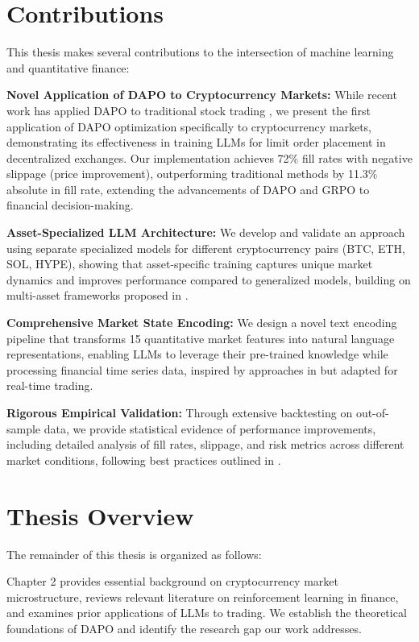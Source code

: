 \documentclass{report}
\begin{document}
\section{Contributions}

This thesis makes several contributions to the intersection of machine learning and quantitative finance:

\textbf{Novel Application of DAPO to Cryptocurrency Markets:} While recent work has applied DAPO to traditional stock trading \cite{Zha2025}, we present the first application of DAPO optimization specifically to cryptocurrency markets, demonstrating its effectiveness in training LLMs for limit order placement in decentralized exchanges. Our implementation achieves 72\% fill rates with negative slippage (price improvement), outperforming traditional methods by 11.3\% absolute in fill rate, extending the advancements of DAPO \cite{DAPO2025} and GRPO \cite{GRPO2024} to financial decision-making.

\textbf{Asset-Specialized LLM Architecture:} We develop and validate an approach using separate specialized models for different cryptocurrency pairs (BTC, ETH, SOL, HYPE), showing that asset-specific training captures unique market dynamics and improves performance compared to generalized models, building on multi-asset frameworks proposed in \cite{Zhang2023}.

\textbf{Comprehensive Market State Encoding:} We design a novel text encoding pipeline that transforms 15 quantitative market features into natural language representations, enabling LLMs to leverage their pre-trained knowledge while processing financial time series data, inspired by approaches in \cite{Wu2023} but adapted for real-time trading.

\textbf{Rigorous Empirical Validation:} Through extensive backtesting on out-of-sample data, we provide statistical evidence of performance improvements, including detailed analysis of fill rates, slippage, and risk metrics across different market conditions, following best practices outlined in \cite{Fang2022}.

\section{Thesis Overview}

The remainder of this thesis is organized as follows:

Chapter 2 provides essential background on cryptocurrency market microstructure, reviews relevant literature on reinforcement learning in finance, and examines prior applications of LLMs to trading. We establish the theoretical foundations of DAPO and identify the research gap our work addresses.
\end{document}
